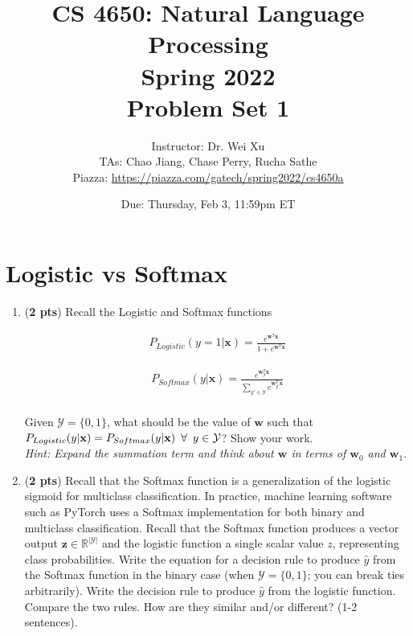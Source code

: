 \documentclass[11pt, letterpaper]{article}
\begin{document}
\title{CS 4650: Natural Language Processing \\ Spring 2022 \\ Problem Set 1}
\author{Instructor: Dr. Wei Xu \\ TAs: Chao Jiang, Chase Perry, Rucha Sathe \\Piazza: \url{https://piazza.com/gatech/spring2022/cs4650a}}
\date{Due: Thursday, Feb 3, 11:59pm ET}
\maketitle

\section{Logistic vs Softmax}

    \begin{enumerate}[label=(\alph*)]
        \item (\textbf{2 pts}) Recall the Logistic and Softmax functions
        
    \begin{align*}
        P_{Logistic}(y=1|\mathbf{x}) = \frac{e^{\mathbf{w}^T\mathbf{x}}}{1 + e^{\mathbf{w}^T\mathbf{x}}}
    \end{align*}
    
    \begin{align*}
        P_{Softmax}(y|\mathbf{x}) = \frac{e^{\mathbf{w}_y^T\mathbf{x}}}{\sum_{y' \in \mathcal{Y}} e^{\mathbf{w}_{y'}^T\mathbf{x}}} \\
    \end{align*}
    
    Given $\mathcal{Y} = \{0,1\}$, what should be the value of $\mathbf{w}$ such that \\ $P_{Logistic}(y|\textbf{x}) = P_{Softmax}(y|\textbf{x}) \hspace{0.5em} \forall \hspace{0.5em} y \in \mathcal{Y}$? Show your work. \\
    \textit{Hint: Expand the summation term and think about $\mathbf{w}$ in terms of $\mathbf{w}_0$ and $\mathbf{w}_1$.}
    
    
    \item (\textbf{2 pts}) Recall that the Softmax function is a generalization of the logistic sigmoid for multiclass classification. In practice, machine learning software such as PyTorch uses a Softmax implementation for both binary and multiclass classification. Recall that the Softmax function produces a vector output $\mathbf{z} \in \mathbb{R}^{|\mathcal{Y}|}$ and the logistic function a single scalar value $z$, representing class probabilities. Write the equation for a decision rule to produce $\hat{y}$ from the Softmax function in the binary case (when $\mathcal{Y} = \{0,1\}$; you can break ties arbitrarily).
    Write the decision rule to produce $\hat{y}$ from the logistic function. Compare the two rules. How are they similar and/or different? (1-2 sentences).
    \end{enumerate}
    
\end{document}
